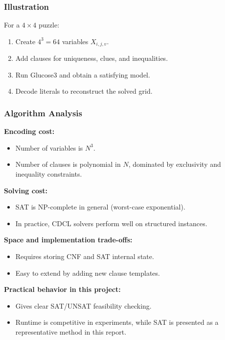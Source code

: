 \subsubsection{Illustration}
For a \(4 \times 4\) puzzle:
\begin{enumerate}
\item Create \(4^3=64\) variables \(X_{i,j,v}\).
\item Add clauses for uniqueness, clues, and inequalities.
\item Run Glucose3 and obtain a satisfying model.
\item Decode literals to reconstruct the solved grid.
\end{enumerate}

\subsubsection{Algorithm Analysis}
\textbf{Encoding cost:}
\begin{itemize}
\item Number of variables is \(N^3\).
\item Number of clauses is polynomial in \(N\), dominated by exclusivity and inequality constraints.
\end{itemize}

\textbf{Solving cost:}
\begin{itemize}
\item SAT is NP-complete in general (worst-case exponential).
\item In practice, CDCL solvers perform well on structured instances.
\end{itemize}

\textbf{Space and implementation trade-offs:}
\begin{itemize}
\item Requires storing CNF and SAT internal state.
\item Easy to extend by adding new clause templates.
\end{itemize}

\textbf{Practical behavior in this project:}
\begin{itemize}
\item Gives clear SAT/UNSAT feasibility checking.
\item Runtime is competitive in experiments, while SAT is presented as a representative method in this report.
\end{itemize}
